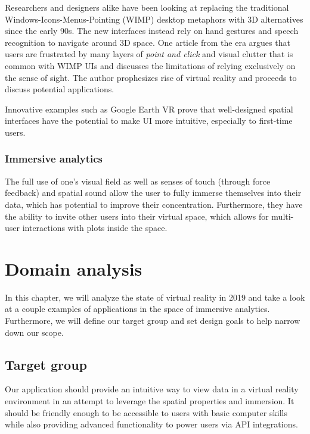 \documentclass[thesis=M,english,hidelinks]{FITthesisXE}[2012/06/26]
\begin{document}
Researchers and designers alike have been looking at replacing the traditional Windows-Icons-Menus-Pointing (WIMP) desktop metaphors with 3D alternatives since the early 90s. The new interfaces instead rely on hand gestures and speech recognition to navigate around 3D space. One article from the era argues that users are frustrated by many layers of \emph{point and click} and visual clutter that is common with WIMP UIs and discusses the limitations of relying exclusively on the sense of sight. The author prophesizes rise of virtual reality and proceeds to discuss potential applications.\autocite{wimp}

Innovative examples such as Google Earth VR prove that well-designed spatial interfaces have the potential to make UI more intuitive, especially to first-time users.\autocite{earthux}

\newpage

\subsection{Immersive analytics}

The full use of one's visual field as well as senses of touch (through force feedback) and spatial sound allow the user to fully immerse themselves into their data, which has potential to improve their concentration. Furthermore, they have the ability to invite other users into their virtual space, which allows for multi-user interactions with plots inside the space.

\chapter{Domain analysis}

In this chapter, we will analyze the state of virtual reality in 2019 and take a look at a couple examples of applications in the space of immersive analytics. Furthermore, we will define our target group and set design goals to help narrow down our scope.

\section{Target group}

Our application should provide an intuitive way to view data in a virtual reality environment in an attempt to leverage the spatial properties and immersion. It should be friendly enough to be accessible to users with basic computer skills while also providing advanced functionality to power users via API integrations.
\end{document}

